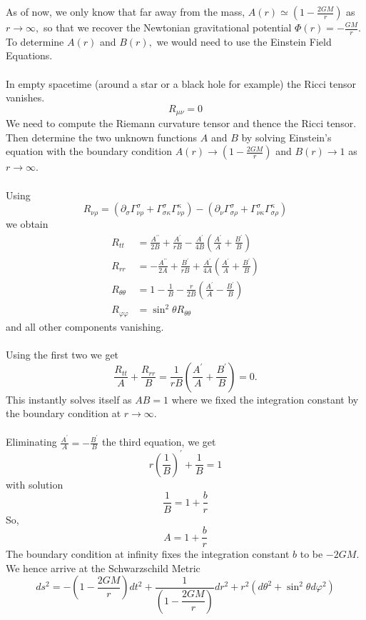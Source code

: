 ﻿\documentclass[12pt,a4paper]{article}
\begin{document}
As of now, we only know that far away from the mass,
$A ( r ) \simeq \left( 1 - \frac { 2 G M } { r } \right)$ as $r \rightarrow \infty ,$ so that we recover the Newtonian gravitational potential
$\Phi ( r ) = - \frac { G M } { r } .$ To determine $A ( r )$ and $B ( r ) ,$ we would need to use the Einstein Field Equations.\\ \\
In empty spacetime (around a star or a black hole for example) the Ricci tensor vanishes.
$$R _ { \mu \nu } = 0$$
We need to compute the Riemann curvature tensor and thence the Ricci tensor. Then determine the two unknown functions $A$ and $B$ by solving Einstein's equation with the boundary condition $A ( r ) \rightarrow \left( 1 - \frac { 2 G M } { r } \right)$ and $B ( r ) \rightarrow 1$ as $r \rightarrow \infty .$\\ \\
Using
$$R _ { \nu \rho } = \left( \partial _ { \sigma } \Gamma _ { \nu \rho } ^ { \sigma } + \Gamma _ { \sigma \kappa } ^ { \sigma } \Gamma _ { \nu \rho } ^ { \kappa } \right) - \left( \partial _ { \nu } \Gamma _ { \sigma \rho } ^ { \sigma } + \Gamma _ { \nu \kappa } ^ { \sigma } \Gamma _ { \sigma \rho } ^ { \kappa } \right)$$
we obtain
$$\begin{aligned} R _ { t t } & = \frac { A ^ { \prime \prime } } { 2 B } + \frac { A ^ { \prime } } { r B } - \frac { A ^ { \prime } } { 4 B } \left( \frac { A ^ { \prime } } { A } + \frac { B ^ { \prime } } { B } \right) \\ R _ { r r } & = - \frac { A ^ { \prime \prime } } { 2 A } + \frac { B ^ { \prime } } { r B } + \frac { A ^ { \prime } } { 4 A } \left( \frac { A ^ { \prime } } { A } + \frac { B ^ { \prime } } { B } \right) \\ R _ { \theta \theta } & = 1 - \frac { 1 } { B } - \frac { r } { 2 B } \left( \frac { A ^ { \prime } } { A } - \frac { B ^ { \prime } } { B } \right)  \\ R _ { \varphi \varphi } & = \sin ^ { 2 } \theta R _ { \theta \theta } \end{aligned}$$
and all other components vanishing.\\ \\
Using the first two we get
$$\frac { R _ { t t } } { A } + \frac { R _ { r r } } { B } = \frac { 1 } { r B } \left( \frac { A ^ { \prime } } { A } + \frac { B ^ { \prime } } { B } \right) = 0 .$$
This instantly solves itself as $A B = 1$ where we fixed the integration constant by the boundary condition at $r \rightarrow \infty.$\\ \\ 
Eliminating $\frac { A ^ { \prime } } { A } = - \frac { B ^ { \prime } } { B }$ the third equation, we get 
$$r \left( \frac { 1 } { B } \right) ^ { \prime } + \frac { 1 } { B } = 1$$
with solution
$$\frac { 1 } { B } = 1 + \frac { b } { r }$$
So,
$$A = 1 + \frac { b } { r }$$
The boundary condition at infinity fixes the integration constant $b$ to be $- 2 G M$.
We hence arrive at the Schwarzschild Metric
$$d s ^ { 2 } = - \left( 1 - \frac { 2 G M } { r } \right) d t ^ { 2 } + \frac { 1 } { \left( 1 - \dfrac { 2 G M } { r } \right) } d r ^ { 2 } + r ^ { 2 } \left( d \theta ^ { 2 } + \sin ^ { 2 } \theta d \varphi ^ { 2 } \right)$$
\end{document}
